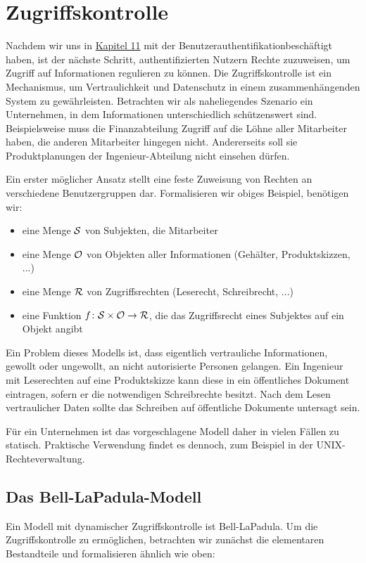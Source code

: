 \chapter{Zugriffskontrolle}
Nachdem wir uns in \hyperref[cha11]{Kapitel 11} mit der
Benutzerauthentifikation\indexAccessControl beschäftigt haben, ist der
nächste Schritt, authentifizierten Nutzern Rechte zuzuweisen, um Zugriff
auf Informationen regulieren zu können. Die Zugriffskontrolle ist ein
Mechanismus, um Vertraulichkeit und Datenschutz in einem
zusammenhängenden System zu gewährleisten.  Betrachten wir als
naheliegendes Szenario ein Unternehmen, in dem Informationen
unterschiedlich schützenswert sind. Beispielsweise muss die
Finanzabteilung Zugriff auf die Löhne aller Mitarbeiter haben, die
anderen Mitarbeiter hingegen nicht. Andererseits soll sie
Produktplanungen der Ingenieur-Abteilung nicht einsehen dürfen.

Ein erster möglicher Ansatz stellt eine feste Zuweisung von Rechten an
verschiedene Benutzergruppen dar.  Formalisieren wir obiges Beispiel,
benötigen wir:

\begin{itemize}
\item eine Menge $\mathcal{S}$ von Subjekten, die Mitarbeiter
\item eine Menge $\mathcal{O}$ von Objekten aller Informationen (Gehälter, Produktskizzen, ...)
\item eine Menge $\mathcal{R}$  von Zugriffsrechten (Leserecht, Schreibrecht, ...)
\item eine Funktion $f\colon \mathcal{S} \times \mathcal{O} \rightarrow \mathcal{R}$, die das Zugriffsrecht eines Subjektes auf ein Objekt angibt
\end{itemize}

Ein Problem dieses Modells ist, dass eigentlich vertrauliche
Informationen, gewollt oder ungewollt, an nicht autorisierte Personen
gelangen. Ein Ingenieur mit Leserechten auf eine Produktskizze kann
diese in ein öffentliches Dokument eintragen, sofern er die notwendigen
Schreibrechte besitzt. Nach dem Lesen vertraulicher Daten sollte das
Schreiben auf öffentliche Dokumente untersagt sein.

Für ein Unternehmen ist das vorgeschlagene Modell daher in vielen Fällen
zu statisch. Praktische Verwendung findet es dennoch, zum Beispiel in
der UNIX-Rechteverwaltung.

\section{Das Bell-LaPadula-Modell}\indexBellLaPadula
Ein Modell mit dynamischer Zugriffskontrolle ist Bell-LaPadula. Um die
Zugriffskontrolle zu ermöglichen, betrachten wir zunächst die
elementaren Bestandteile und formalisieren ähnlich wie oben: 

